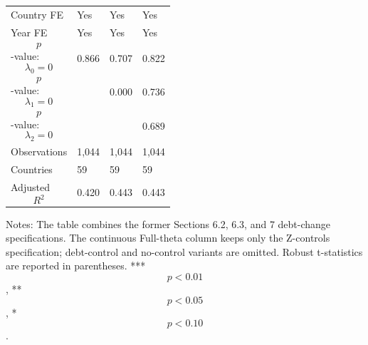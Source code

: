 \begin{table}[H]
\begin{threeparttable}
\begin{tabularx}{\textwidth}{lYYY}
Country FE & Yes & Yes & Yes \\
Year FE & Yes & Yes & Yes \\
$$p$$-value: $$\lambda_0=0$$ & 0.866 & 0.707 & 0.822 \\
$$p$$-value: $$\lambda_1=0$$ &  & 0.000 & 0.736 \\
$$p$$-value: $$\lambda_2=0$$ &  &  & 0.689 \\
Observations & 1,044 & 1,044 & 1,044 \\
Countries & 59 & 59 & 59 \\
Adjusted $$R^2$$ & 0.420 & 0.443 & 0.443 \\
\bottomrule
\end{tabularx}
\begin{tablenotes}[flushleft]\footnotesize
\item Notes: The table combines the former Sections 6.2, 6.3, and 7 debt-change specifications. The continuous Full-theta column keeps only the Z-controls specification; debt-control and no-control variants are omitted. Robust t-statistics are reported in parentheses. *** $$p<0.01$$, ** $$p<0.05$$, * $$p<0.10$$.
\end{tablenotes}
\end{threeparttable}
\end{table}
